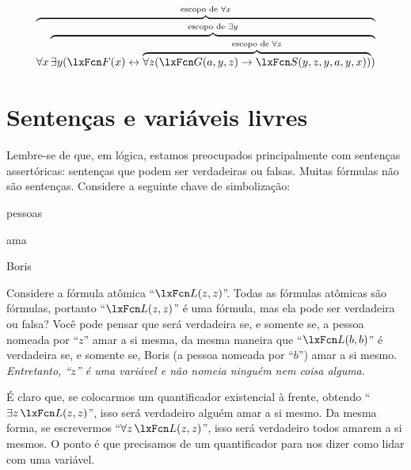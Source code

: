 $$\overbrace{\forall x \overbrace{\exists y (\atom{F}{x} \eiff \overbrace{\forall z (\atom{G}{a,y,z} \eif \atom{S}{y,z,y,a,y,x})}^{\text{escopo de }\forall z})}^{\text{escopo de }\exists y}}^{\text{escopo de }\forall x}$$







\section{Sentenças e variáveis livres}\label{s:FreeVars}

Lembre-se de que, em lógica, estamos preocupados principalmente com sentenças assertóricas: sentenças que podem ser verdadeiras ou falsas. Muitas fórmulas não são sentenças. Considere a seguinte chave de simbolização:


	\begin{ekey}
\item[\text{domínio}] pessoas
\item[\atom{L}{x,y}]  ama 
		\item[b] Boris
	\end{ekey}
Considere a fórmula atômica \textquotedblleft $\atom{L}{z,z}$\textquotedblright{}. Todas as fórmulas atômicas são fórmulas, portanto \textquotedblleft $\atom{L}{z,z}$\textquotedblright{} é uma fórmula, mas ela pode ser verdadeira ou falsa? Você pode pensar que será verdadeira se, e somente se, a pessoa nomeada por \textquotedblleft $z$\textquotedblright{} amar a si mesma, da mesma maneira que \textquotedblleft $\atom{L}{b,b}$\textquotedblright{} é verdadeira se, e somente se, Boris (a pessoa nomeada por \textquotedblleft $b$\textquotedblright{}) amar a si mesmo. \emph{Entretanto, \textquotedblleft $z$\textquotedblright{} é uma variável e não nomeia ninguém nem coisa alguma.}







É claro que, se colocarmos um quantificador existencial à frente, obtendo \textquotedblleft $\exists z\,\atom{L}{z,z}$\textquotedblright{}, isso será verdadeiro \ifeff{} alguém amar a si mesmo. Da mesma forma, se escrevermos \textquotedblleft $\forall z\, \atom{L}{z,z}$\textquotedblright{}, isso será verdadeiro \ifeff{} todos amarem a si mesmos. O ponto é que precisamos de um quantificador para nos dizer como lidar com uma variável.





